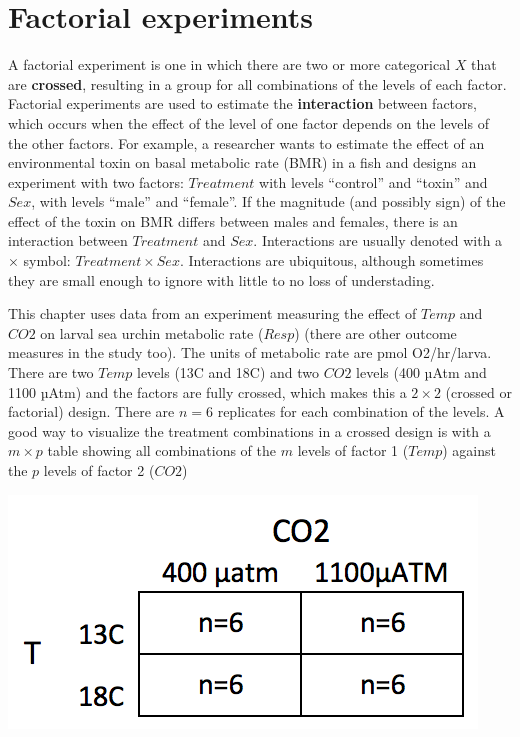 \documentclass[]{book}
\begin{document}
\hypertarget{factorial-experiments}{%
\section{Factorial experiments}\label{factorial-experiments}}

A factorial experiment is one in which there are two or more categorical \(X\) that are \textbf{crossed}, resulting in a group for all combinations of the levels of each factor. Factorial experiments are used to estimate the \textbf{interaction} between factors, which occurs when the effect of the level of one factor depends on the levels of the other factors. For example, a researcher wants to estimate the effect of an environmental toxin on basal metabolic rate (BMR) in a fish and designs an experiment with two factors: \(Treatment\) with levels ``control'' and ``toxin'' and \(Sex\), with levels ``male'' and ``female''. If the magnitude (and possibly sign) of the effect of the toxin on BMR differs between males and females, there is an interaction between \(Treatment\) and \(Sex\). Interactions are usually denoted with a \(\times\) symbol: \(Treatment \times Sex\). Interactions are ubiquitous, although sometimes they are small enough to ignore with little to no loss of understading.

This chapter uses data from an experiment measuring the effect of \(Temp\) and \(CO2\) on larval sea urchin metabolic rate (\(Resp\)) (there are other outcome measures in the study too). The units of metabolic rate are pmol O2/hr/larva. There are two \(Temp\) levels (13C and 18C) and two \(CO2\) levels (400 µAtm and 1100 µAtm) and the factors are fully crossed, which makes this a \(2 \times 2\) (crossed or factorial) design. There are \(n=6\) replicates for each combination of the levels. A good way to visualize the treatment combinations in a crossed design is with a \(m \times p\) table showing all combinations of the \(m\) levels of factor 1 (\(Temp\)) against the \(p\) levels of factor 2 (\(CO2\))

\includegraphics{images/2x2_table.png}
\end{document}
